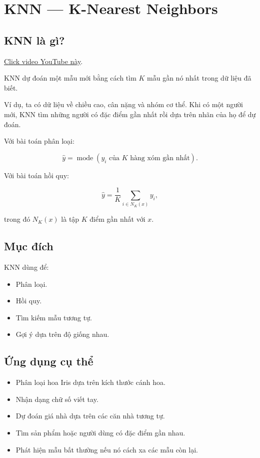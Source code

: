 \documentclass[12pt,a4paper]{report}
\begin{document}
\section{KNN --- K-Nearest Neighbors}

\subsection{KNN là gì?}

\href{https://www.youtube.com/watch?v=KarBce2DeVE}{Click video YouTube này}.

KNN dự đoán một mẫu mới bằng cách tìm \(K\) mẫu gần nó nhất trong dữ liệu đã biết.

Ví dụ, ta có dữ liệu về chiều cao, cân nặng và nhóm cơ thể. Khi có một người mới, KNN tìm những người có đặc điểm gần nhất rồi dựa trên nhãn của họ để dự đoán.

Với bài toán phân loại:

\begin{equation}
\hat{y}
=
\operatorname{mode}
\left(
y_i \text{ của } K \text{ hàng xóm gần nhất}
\right).
\end{equation}

Với bài toán hồi quy:

\begin{equation}
\hat{y}
=
\frac{1}{K}
\sum_{i \in N_K(x)} y_i,
\end{equation}

trong đó \(N_K(x)\) là tập \(K\) điểm gần nhất với \(x\).

\subsection{Mục đích}

KNN dùng để:

\begin{itemize}[leftmargin=1.5em]
    \item Phân loại.
    \item Hồi quy.
    \item Tìm kiếm mẫu tương tự.
    \item Gợi ý dựa trên độ giống nhau.
\end{itemize}

\subsection{Ứng dụng cụ thể}

\begin{itemize}[leftmargin=1.5em]
    \item Phân loại hoa Iris dựa trên kích thước cánh hoa.
    \item Nhận dạng chữ số viết tay.
    \item Dự đoán giá nhà dựa trên các căn nhà tương tự.
    \item Tìm sản phẩm hoặc người dùng có đặc điểm gần nhau.
    \item Phát hiện mẫu bất thường nếu nó cách xa các mẫu còn lại.
\end{itemize}
\end{document}
